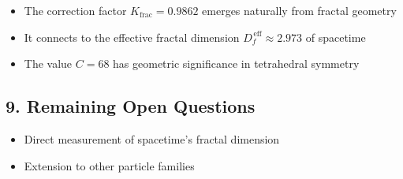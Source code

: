 	\begin{itemize}
		\item The correction factor $K_{\text{frac}} = 0.9862$ emerges naturally from fractal geometry
		\item It connects to the effective fractal dimension $D_f^{\,\text{eff}} \approx 2.973$ of spacetime
		\item The value $C = 68$ has geometric significance in tetrahedral symmetry
	\end{itemize}
	
	\subsection*{9. Remaining Open Questions}
	
	\begin{itemize}
		\item Direct measurement of spacetime's fractal dimension

		\item Extension to other particle families
	\end{itemize}
